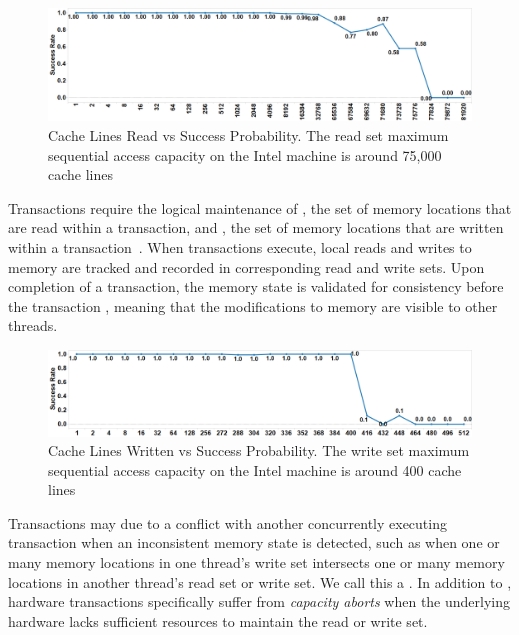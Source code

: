 \begin{figure}[H]%
\centering
\includegraphics[width=\linewidth]{images/wttm_capacity_read_intel}
\caption{Cache Lines Read vs Success Probability. The read set maximum sequential access capacity on the Intel machine is
around 75,000 cache lines}
\label{fig:wttm_capacity_read_intel}
\end{figure}



Transactions require the logical 
maintenance of , the set
of memory locations that are read within a 
transaction, and , the set
of memory locations that are written within 
a transaction~\cite{HerlihyMo93}. When transactions execute, 
local reads and writes to memory 
are tracked and recorded in
corresponding read and write sets. Upon 
completion of a transaction, the memory state is validated for 
consistency before the transaction
, meaning that the modifications to 
memory are visible to other threads.


\begin{figure}[H]%
\centering
\includegraphics[width=\linewidth]{images/wttm_capacity_write_intel}
\caption{Cache Lines Written vs Success Probability. 
The write set maximum sequential access capacity on the Intel machine is
around 400 cache lines}
\label{fig:wttm_capacity_write_intel}
\end{figure}

Transactions may  due to a conflict with
another concurrently executing transaction when an
inconsistent memory state is detected, 
such as when one or many memory locations
in one thread's write set intersects one or 
many memory locations in another
thread's read set or write set.  We call this a
.  In addition to ,
hardware transactions specifically suffer 
from \textit{capacity aborts} when the underlying hardware
lacks sufficient resources to maintain the
read or write set.

